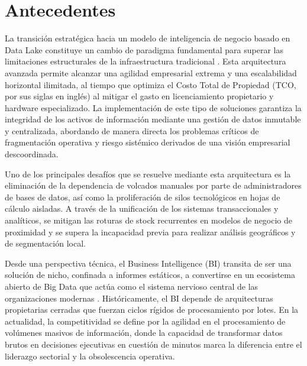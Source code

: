 
\section{Antecedentes}

La transición estratégica hacia un modelo de inteligencia de negocio basado en Data Lake constituye un cambio de paradigma fundamental para superar las limitaciones estructurales de la infraestructura tradicional \parencite{tagarro2019desarrollo}. Esta arquitectura avanzada permite alcanzar una agilidad empresarial extrema y una escalabilidad horizontal ilimitada, al tiempo que optimiza el Costo Total de Propiedad (TCO, por sus siglas en inglés) al mitigar el gasto en licenciamiento propietario y hardware especializado. La implementación de este tipo de soluciones garantiza la integridad de los activos de información mediante una gestión de datos inmutable y centralizada, abordando de manera directa los problemas críticos de fragmentación operativa y riesgo sistémico derivados de una visión empresarial descoordinada.

Uno de los principales desafíos que se resuelve mediante esta arquitectura es la eliminación de la dependencia de volcados manuales por parte de administradores de bases de datos, así como la proliferación de silos tecnológicos en hojas de cálculo aisladas. A través de la unificación de los sistemas transaccionales y analíticos, se mitigan las roturas de stock recurrentes en modelos de negocio de proximidad y se supera la incapacidad previa para realizar análisis geográficos y de segmentación local.

Desde una perspectiva técnica, el Business Intelligence (BI) transita de ser una solución de nicho, confinada a informes estáticos, a convertirse en un ecosistema abierto de Big Data que actúa como el sistema nervioso central de las organizaciones modernas \parencite{tagarro2019desarrollo}. Históricamente, el BI depende de arquitecturas propietarias cerradas que fuerzan ciclos rígidos de procesamiento por lotes. En la actualidad, la competitividad se define por la agilidad en el procesamiento de volúmenes masivos de información, donde la capacidad de transformar datos brutos en decisiones ejecutivas en cuestión de minutos marca la diferencia entre el liderazgo sectorial y la obsolescencia operativa.

